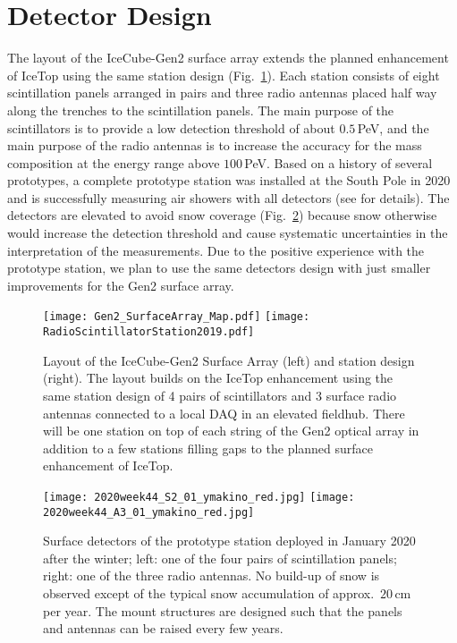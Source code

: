 \documentclass[a4paper,11pt]{article}
\begin{document}
\section{Detector Design}
The layout of the IceCube-Gen2 surface array extends the planned enhancement of IceTop \cite{Haungs:2019ylq} using the same station design (Fig.~\ref{fig:layout}). 
Each station consists of eight scintillation panels arranged in pairs and three radio antennas placed half way along the trenches to the scintillation panels. 
The main purpose of the scintillators is to provide a low detection threshold of about $0.5\,$PeV, and the main purpose of the radio antennas is to increase the accuracy for the mass composition at the energy range above $100\,$PeV.
Based on a history of several prototypes, a complete prototype station was installed at the South Pole in 2020 and is successfully measuring air showers with all detectors (see \cite{SurfaceArray_ICRC2021} for details). 
The detectors are elevated to avoid snow coverage (Fig.~\ref{fig:detectors}) because snow otherwise would increase the detection threshold and cause systematic uncertainties in the interpretation of the measurements.
Due to the positive experience with the prototype station, we plan to use the same detectors design with just smaller improvements for the Gen2 surface array.

\begin{figure}[t]
    \centering
    \texttt{[image: Gen2\_SurfaceArray\_Map.pdf]}
    \hfill
    \texttt{[image: RadioScintillatorStation2019.pdf]}
    \caption{Layout of the IceCube-Gen2 Surface Array (left) and station design (right). The layout builds on the IceTop enhancement using the same station design of 4 pairs of scintillators and 3 surface radio antennas connected to a local DAQ in an elevated fieldhub. There will be one station on top of each string of the Gen2 optical array in addition to a few stations filling gaps to the planned surface enhancement of IceTop.
    }
    \label{fig:layout}
\end{figure}


\begin{figure}[t]
    \centering
    \texttt{[image: 2020week44\_S2\_01\_ymakino\_red.jpg]}
    \hfill
    \texttt{[image: 2020week44\_A3\_01\_ymakino\_red.jpg]}
    \caption{Surface detectors of the prototype station deployed in January 2020 after the winter; left: one of the four pairs of scintillation panels; right: one of the three radio antennas. No build-up of snow is observed except of the typical snow accumulation of approx.~$20\,$cm per year. The mount structures are designed such that the panels and antennas can be raised every few years.
    }
    \label{fig:detectors}
\end{figure}
\end{document}
